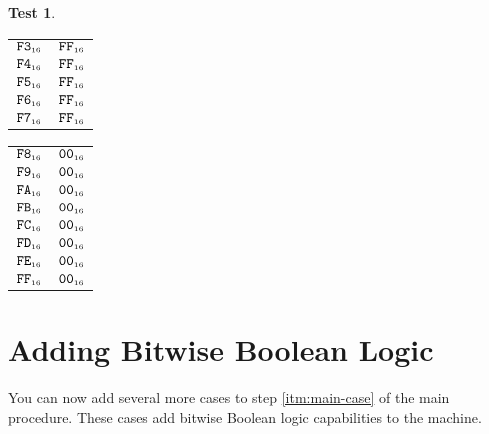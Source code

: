 \documentclass[a4paper,12pt]{article}
\makeatletter
\newcommand{\num}[1]{\texttt{#1}}
\newcommand{\hex}[1]{\num{#1}_{\textup{\tiny 16}}}
\newcommand{\MEM}[1]{\ifthenelse{\equal{#1}{}}{M}{M[#1]}}
\theoremstyle{definition}
\newtheorem{test}{Test}
\newenvironment{memtable}{%
  \begin{trivlist}
    \item
    }{%
    \end{trivlist}}
\newenvironment{memcolumn}{%
  \begin{tabular}{@{}ll@{}}
    \hline}
    {%
    \hline
  \end{tabular}}
\newcommand{\memspace}{\qquad}
\makeatother
\begin{document}
\begin{test}
\begin{memtable}
\begin{memcolumn}
      $\hex{F3}$ & $\hex{FF}$ \\
      $\hex{F4}$ & $\hex{FF}$ \\
      $\hex{F5}$ & $\hex{FF}$ \\
      $\hex{F6}$ & $\hex{FF}$ \\
      $\hex{F7}$ & $\hex{FF}$ \\
    \end{memcolumn}
    \memspace
    \begin{memcolumn}
      $\hex{F8}$ & $\hex{00}$ \\
      $\hex{F9}$ & $\hex{00}$ \\
      $\hex{FA}$ & $\hex{00}$ \\
      $\hex{FB}$ & $\hex{00}$ \\
      $\hex{FC}$ & $\hex{00}$ \\
      $\hex{FD}$ & $\hex{00}$ \\
      $\hex{FE}$ & $\hex{00}$ \\
      $\hex{FF}$ & $\hex{00}$ \\
    \end{memcolumn}
  \end{memtable}
\end{test}

\section{Adding Bitwise Boolean Logic}

You can now add several more cases to step \ref{itm:main-case} of the main procedure.
These cases add bitwise Boolean logic capabilities to the machine.
\end{document}
